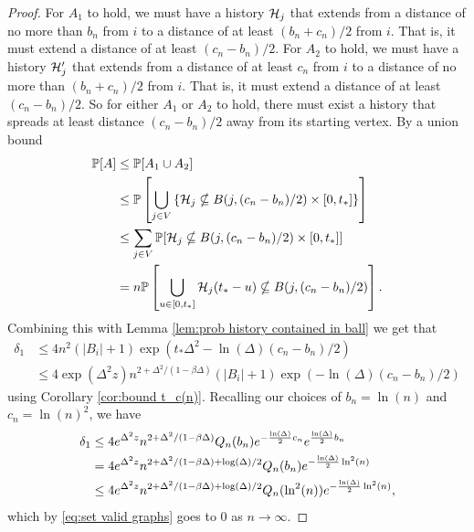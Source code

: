 \begin{proof}
		For $A_1$ to hold, we must have a history $\mathcal{H}_j$ that extends from a distance of no more than $b_n$ from $i$ to a distance of at least $(b_n + c_n)/2$ from $i$. That is, it must extend a distance of at least $(c_n - b_n)/2$. For $A_2$ to hold, we must have a history $\mathcal{H}_j'$ that extends from a distance of at least $c_n$ from $i$ to a distance of no more than $(b_n + c_n)/2$ from $i$. That is, it must extend a distance of at least $(c_n - b_n)/2$. So for either $A_1$ or $A_2$ to hold, there must exist a history that spreads at least distance $(c_n - b_n) / 2$ away from its starting vertex. 
		By a union bound
		\begin{align}
			\mathbb{P}[A] &\leq \mathbb{P}[A_1 \cup A_2]\\
				&\leq \mathbb{P}\left[\bigcup_{j \in V} \left\{\mathcal{H}_j \nsubseteq B(j, (c_n - b_n)/2) \times [0, t_*] \right\} \right]\\
				&\leq \sum_{j \in V} \mathbb{P}[\mathcal{H}_j \nsubseteq B(j, (c_n - b_n)/2) \times [0, t_*]]\\
				&= n \mathbb{P}\left[\bigcup_{u \in [0, t_*]}\mathcal{H}_j(t_* - u) \nsubseteq B(j, (c_n - b_n)/2)\right].
		\end{align}
		Combining this with Lemma \ref{lem:prob history contained in ball} we get that
		\begin{align}
			\delta_1 &\leq 4 n^2 (|B_i| + 1) \exp(t_* \Delta^2 - \ln(\Delta)(c_n - b_n)/2)\\
			&\leq 4 \exp(\Delta^2 z) n^{2 + \Delta^2/(1 - \beta \Delta)}(|B_i| + 1) \exp(-\ln (\Delta) (c_n - b_n)/2)
		\end{align}
		using Corollary \ref{cor:bound t_c(n)}. Recalling our choices of $b_n = \ln(n)$ and $c_n = \ln(n)^2$, we have
		\begin{align}
			\delta_1 &\leq 4 e^{\Delta^2 z} n^{2 + \Delta^2/(1 - \beta \Delta)} Q_n(b_n) e^{-\frac{\ln(\Delta)}{2} c_n} e^{\frac{\ln(\Delta)}{2} b_n}\\
			&= 4 e^{\Delta^2 z} n^{2 + \Delta^2/(1 - \beta \Delta) + \log(\Delta)/2} Q_n(b_n) e^{-\frac{\ln(\Delta)}{2} \ln^2(n)}\\
			&\leq 4 e^{\Delta^2 z} n^{2 + \Delta^2/(1 - \beta \Delta) + \log(\Delta)/2} Q_n(\ln^2(n)) e^{-\frac{\ln(\Delta)}{2} \ln^2(n)},
		\end{align}
		which by \eqref{eq:set valid graphs} goes to $0$ as $n \rightarrow \infty$.


\end{proof}
